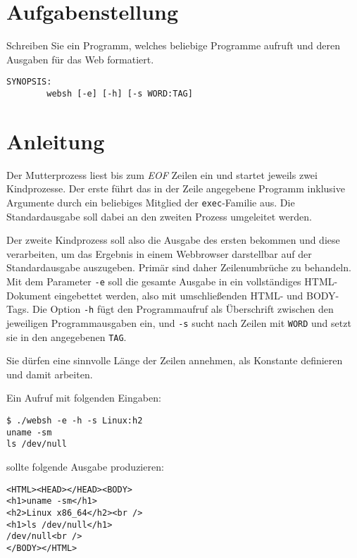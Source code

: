 




\section*{Aufgabenstellung}

Schreiben Sie ein Programm, welches beliebige Programme aufruft und
deren Ausgaben für das Web formatiert.

\begin{verbatim}
SYNOPSIS:
        websh [-e] [-h] [-s WORD:TAG]
\end{verbatim}



\section*{Anleitung}

Der Mutterprozess liest bis zum \textit{EOF} Zeilen ein und startet
jeweils zwei Kindprozesse. Der erste führt das in der Zeile angegebene
Programm inklusive Argumente durch ein beliebiges Mitglied der
\verb_exec_-Familie aus. Die Standardausgabe soll dabei an den zweiten
Prozess umgeleitet werden.

Der zweite Kindprozess soll also die Ausgabe des ersten bekommen und
diese verarbeiten, um das Ergebnis in einem Webbrowser darstellbar auf
der Standardausgabe auszugeben. Primär sind daher Zeilenumbrüche zu
behandeln. Mit dem Parameter \verb_-e_ soll die gesamte Ausgabe in ein
vollständiges HTML-Dokument eingebettet werden, also mit
umschließenden HTML- und BODY-Tags. Die Option \verb_-h_ fügt den
Programmaufruf als Überschrift zwischen den jeweiligen
Programmausgaben ein, und \verb_-s_ sucht nach Zeilen mit \verb_WORD_
und setzt sie in den angegebenen \verb_TAG_.

Sie dürfen eine sinnvolle Länge der Zeilen annehmen, als Konstante
definieren und damit arbeiten.

Ein Aufruf mit folgenden Eingaben: 

\begin{verbatim}
$ ./websh -e -h -s Linux:h2
uname -sm
ls /dev/null
\end{verbatim}

sollte folgende Ausgabe produzieren:

\begin{verbatim}
<HTML><HEAD></HEAD><BODY>
<h1>uname -sm</h1>
<h2>Linux x86_64</h2><br />
<h1>ls /dev/null</h1>
/dev/null<br />
</BODY></HTML> 
\end{verbatim}

\osueguidelinestwo


